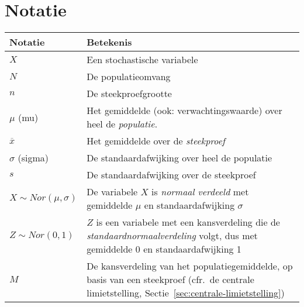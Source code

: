\chapter{Notatie}

\begin{table}
  \centering
  \begin{tabular}{p{}p{}}
    \toprule
    \textbf{Notatie} & \textbf{Betekenis} \\
    \midrule
    $X$                       & Een stochastische variabele \\
    $N$                       & De populatieomvang \\
    $n$                       & De steekproefgrootte \\
    $\mu$ (mu)                & Het gemiddelde (ook: verwachtingswaarde) over heel de \emph{populatie}. \\
    $\overline{x}$            & Het gemiddelde over de \emph{steekproef} \\
    $\sigma$ (sigma)          & De standaardafwijking over heel de populatie \\
    $s$                       & De standaardafwijking over de steekproef \\
    $X \sim Nor(\mu, \sigma)$ & De variabele $X$ is \emph{normaal verdeeld} met gemiddelde $\mu$ en standaardafwijking $\sigma$ \\
    $Z \sim Nor(0, 1)$        & $Z$ is een variabele met een kansverdeling die de \emph{standaardnormaalverdeling} volgt, dus met gemiddelde 0 en standaardafwijking 1 \\
    $M$                       & De kansverdeling van het populatiegemiddelde, op basis van een steekproef (cfr.~de centrale limietstelling, Sectie~\ref{sec:centrale-limietstelling}) \\

    \bottomrule
  \end{tabular}
\end{table}
